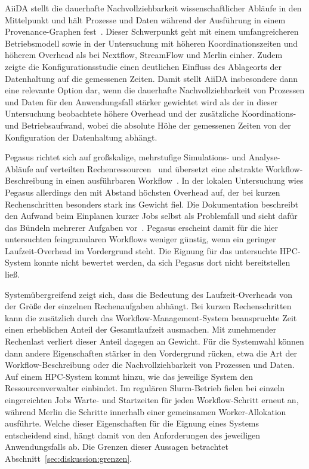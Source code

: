 AiiDA stellt die dauerhafte Nachvollziehbarkeit wissenschaftlicher
Abläufe in den Mittelpunkt und hält Prozesse und Daten während der
Ausführung in einem Provenance-Graphen
fest~\cite{huber2020aiida}. Dieser Schwerpunkt geht mit einem
umfangreicheren Betriebsmodell sowie in der Untersuchung mit
höheren Koordinationszeiten und höherem Overhead als bei Nextflow,
StreamFlow und Merlin einher. Zudem zeigte die Konfigurationsstudie
einen deutlichen Einfluss des Ablageorts der Datenhaltung auf die
gemessenen Zeiten. Damit stellt AiiDA insbesondere dann eine relevante Option dar, wenn die dauerhafte Nachvollziehbarkeit von Prozessen und Daten
für den Anwendungsfall stärker gewichtet wird als der in dieser
Untersuchung beobachtete höhere Overhead und der
zusätzliche Koordinations- und Betriebsaufwand, wobei die absolute Höhe der
gemessenen Zeiten von der Konfiguration der Datenhaltung abhängt.

Pegasus richtet sich auf großskalige, mehrstufige Simulations- und
Analyse-Abläufe auf verteilten
Rechenressourcen~\cite[S.~17]{deelman2015pegasus} und übersetzt eine
abstrakte Workflow-Beschreibung in einen ausführbaren
Workflow~\cite[S.~18]{deelman2015pegasus}. In der lokalen
Untersuchung wies Pegasus allerdings den mit Abstand höchsten
Overhead auf, der bei kurzen Rechenschritten besonders stark ins
Gewicht fiel. Die Dokumentation beschreibt den Aufwand beim
Einplanen kurzer Jobs selbst als Problemfall und sieht dafür das
Bündeln mehrerer Aufgaben vor~\cite{pegasusdocs-optimizing}.
Pegasus erscheint damit für die hier untersuchten feingranularen
Workflows weniger günstig, wenn ein geringer Laufzeit-Overhead im
Vordergrund steht. Die Eignung für das untersuchte HPC-System
konnte nicht bewertet werden, da sich Pegasus dort nicht
bereitstellen ließ.

Systemübergreifend zeigt sich, dass die Bedeutung des
Laufzeit-Overheads von der Größe der einzelnen Rechenaufgaben
abhängt. Bei kurzen Rechenschritten kann die zusätzlich durch das
Workflow-Management-System beanspruchte Zeit einen erheblichen
Anteil der Gesamtlaufzeit ausmachen. Mit zunehmender Rechenlast
verliert dieser Anteil dagegen an Gewicht. Für die Systemwahl können dann andere Eigenschaften stärker in den Vordergrund rücken, etwa die Art der Workflow-Beschreibung oder die
Nachvollziehbarkeit von Prozessen und Daten. Auf einem HPC-System
kommt hinzu, wie das jeweilige System den Ressourcenverwalter
einbindet. Im regulären Slurm-Betrieb fielen bei einzeln
eingereichten Jobs Warte- und Startzeiten für jeden
Workflow-Schritt erneut an, während Merlin die Schritte innerhalb
einer gemeinsamen Worker-Allokation ausführte. Welche dieser
Eigenschaften für die Eignung eines Systems entscheidend sind,
hängt damit von den Anforderungen des jeweiligen Anwendungsfalls
ab. Die Grenzen dieser Aussagen betrachtet
Abschnitt~\ref{sec:diskussion:grenzen}.

